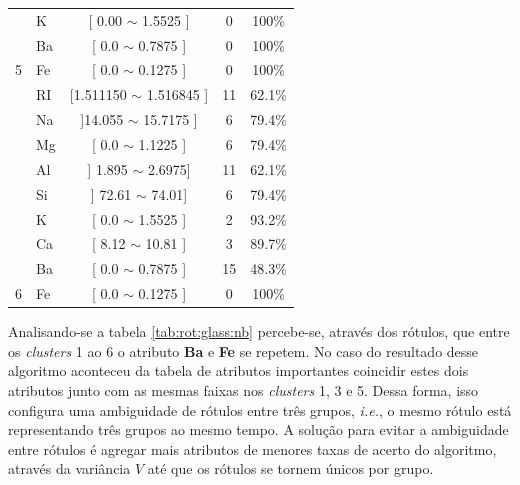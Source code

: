 \begin{table}[!ht]
{\begin{tabular}{llccc}
                                            & K     & [ 0.00 $\sim$ 1.5525 ]     & 0 & 100\% \\ 
                                            & Ba     & [ 0.0 $\sim$  0.7875 ]    &  0 & 100\% \\  
\multirow{-3}{*}{5}                         & Fe    & [ 0.0 $\sim$  0.1275 ]     &  0 & 100\% \\  \hline
                                            & RI     & [1.511150 $\sim$  1.516845 ] &  11  & 62.1\% \\ 
                                            & Na     & ]14.055 $\sim$  15.7175 ] &  6  & 79.4\% \\ 
                                             & Mg    & [ 0.0 $\sim$  1.1225 ]    & 6  & 79.4\%\\ 
                                             & Al    & ] 1.895 $\sim$  2.6975]      &  11  & 62.1\%\\
                                            & Si    & ] 72.61 $\sim$  74.01]      &  6  & 79.4\%\\
                                            & K     & [  0.0 $\sim$  1.5525 ]    &  2  & 93.2\% \\ 
                                            & Ca     & [ 8.12 $\sim$ 10.81 ]    &  3  & 89.7\% \\ 
                                            & Ba     & [ 0.0 $\sim$  0.7875 ]    &  15  & 48.3\% \\  
\multirow{-3}{*}{6}                         & Fe    & [ 0.0 $\sim$  0.1275 ]     &  0  & 100\% \\  \hline

\end{tabular}
}
\end{table}



Analisando-se a tabela \ref{tab:rot:glass:nb} percebe-se, através dos rótulos, que entre os \textit{clusters} 1 ao 6 o atributo \textbf{Ba} e \textbf{Fe} se repetem. No caso do resultado desse algoritmo aconteceu da tabela de atributos importantes coincidir estes dois atributos junto com as mesmas faixas nos \textit{clusters} 1, 3 e 5. Dessa forma, isso configura uma ambiguidade de rótulos entre três grupos, \textit{i.e.}, o mesmo rótulo está representando três grupos ao mesmo tempo. A solução para evitar a ambiguidade entre rótulos é agregar mais atributos de menores taxas de acerto do algoritmo, através da variância ${V}$ até que os rótulos se tornem únicos por grupo. 


